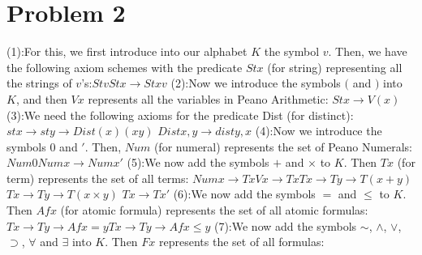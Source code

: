 \documentclass{article}
\newcommand*{\oldneg}{\mathord{\sim}}
\theoremstyle{definition}
\begin{document}
\section*{Problem 2}
(1):\newline For this, we first introduce into our alphabet $K$ the symbol $v$. Then, we have the following axiom schemes with the predicate $Stx$ 
(for string)
 representing all the strings of $v$'s:\newline $Stv$\newline $Stx\rightarrow Stxv$\newline
(2):\newline Now we introduce the symbols $($ and $)$ into $K$, and then $Vx$ represents all the variables in Peano Arithmetic:\newline
$Stx\rightarrow V(x)$\newline
(3):\newline We need the following axioms for the predicate Dist (for distinct):\newline $stx\rightarrow sty\rightarrow Dist(x)(xy)$\newline
$Distx,y\rightarrow disty,x$\newline
(4):\newline Now we introduce the symbols $0$ and $'$. Then, $Num$ (for numeral) represents the set of Peano Numerals:\newline
$Num0$\newline $Numx\rightarrow Numx'$\newline
(5):\newline We now add the symbols $+$ and $\times$ to $K$. Then $Tx$ (for term) represents the set of all terms:\newline
$Numx\rightarrow Tx$\newline $Vx\rightarrow Tx$\newline $Tx\rightarrow Ty\rightarrow T(x+y)$\newline $Tx\rightarrow Ty\rightarrow T(x\times y)$\newline
$Tx\rightarrow Tx'$\newline
(6):\newline We now add the symbols $=$ and $\le$ to $K$. Then $Afx$ (for atomic formula) represents the set of all atomic formulas:\newline
$Tx\rightarrow Ty\rightarrow Afx=y$\newline $Tx\rightarrow Ty\rightarrow Afx\le y$\newline
(7):\newline We now add the symbols $\oldneg$, $\wedge$, $\vee$, $\supset$, $\forall$ and $\exists$ into $K$. Then $Fx$ represents the set of all formulas:
\end{document}
